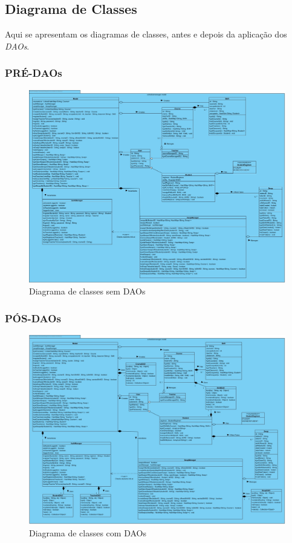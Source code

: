 \documentclass[a4paper]{article}
\begin{document}
\subsection{Diagrama de Classes}

Aqui se apresentam os diagramas de classes, antes e depois da aplicação dos \emph{DAOs}.

\subsubsection{PRÉ-DAOs}
\begin{figure}[H]
\centering
\includegraphics[width=14cm]{DiagramaClasses}
\caption{Diagrama de classes sem DAOs}
\label{}
\end{figure}

\subsubsection{PÓS-DAOs}
\begin{figure}[H]
\centering
\includegraphics[width=14cm]{DiagramaClassesDAO}
\caption{Diagrama de classes com DAOs}
\label{}
\end{figure}
\end{document}
